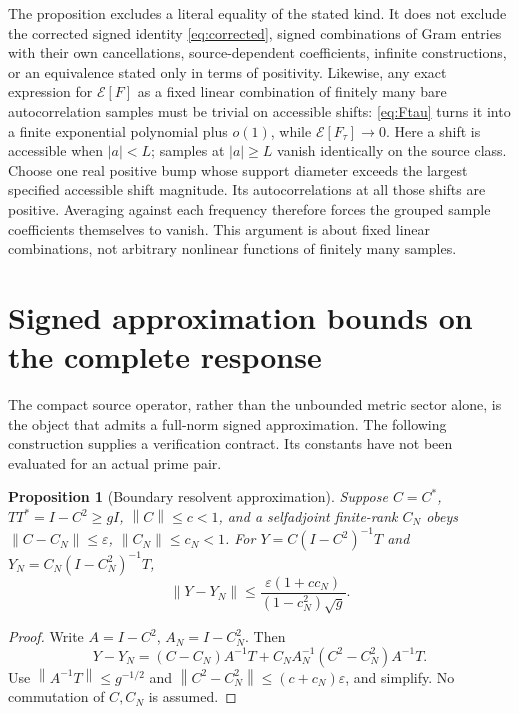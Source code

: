\documentclass[11pt]{article}
\newtheorem{proposition}[theorem]{Proposition}
\theoremstyle{remark}
\newcommand{\norm}[1]{\left\lVert#1\right\rVert}
\numberwithin{equation}{section}
\begin{document}
The proposition excludes a literal equality of the stated kind.
It does not exclude the corrected signed identity
\eqref{eq:corrected}, signed combinations of Gram entries with their
own cancellations, source-dependent coefficients, infinite
constructions, or an equivalence stated only in terms of positivity.
Likewise, any exact expression for \(\mathcal E[F]\) as a fixed linear
combination of finitely many bare autocorrelation samples must be trivial
on accessible shifts: \eqref{eq:Ftau} turns it into a finite exponential
polynomial plus \(o(1)\), while \(\mathcal E[F_\tau]\to0\).
Here a shift is accessible when \(|a|<L\); samples at \(|a|\ge L\)
vanish identically on the source class. Choose one real positive bump
whose support diameter exceeds the largest specified accessible shift
magnitude. Its autocorrelations at all those shifts are positive.
Averaging against each frequency therefore forces the grouped sample
coefficients themselves to vanish. This argument is about fixed linear
combinations, not arbitrary nonlinear functions of finitely many samples.

\section{Signed approximation bounds on the complete response}\label{sec:enclosure}

The compact source operator, rather than the unbounded metric sector
alone, is the object that admits a full-norm signed approximation.
The following construction supplies a verification contract. Its constants
have not been evaluated for an actual prime pair.

\begin{proposition}[Boundary resolvent approximation]\label{prop:resolvent}
Suppose \(C=C^*\), \(TT^*=I-C^2\ge gI\), \(\norm C\le c<1\), and
a selfadjoint finite-rank \(C_N\) obeys
\(\norm{C-C_N}\le\varepsilon\), \(\norm{C_N}\le c_N<1\).
For \(Y=C(I-C^2)^{-1}T\) and
\(Y_N=C_N(I-C_N^2)^{-1}T\),
\begin{equation}\label{eq:reserror}
 \norm{Y-Y_N}\le
 \frac{\varepsilon(1+cc_N)}{(1-c_N^2)\sqrt g}.
\end{equation}
\end{proposition}
\begin{proof}
Write \(A=I-C^2\), \(A_N=I-C_N^2\). Then
\[
 Y-Y_N=(C-C_N)A^{-1}T+
              C_NA_N^{-1}(C^2-C_N^2)A^{-1}T .
\]
Use \(\norm{A^{-1}T}\le g^{-1/2}\) and
\(\norm{C^2-C_N^2}\le(c+c_N)\varepsilon\), and simplify.
No commutation of \(C,C_N\) is assumed.
\end{proof}
\end{document}
